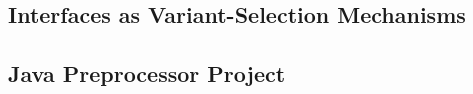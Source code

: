 %
%





\subsection{Interfaces as Variant-Selection Mechanisms}
\label{sc:interfaces}


\subsection{Java Preprocessor Project}
\label{sc:prepros}



